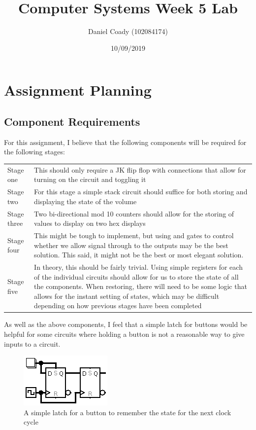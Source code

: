 \documentclass[11pt]{scrartcl}
\title{Computer Systems Week 5 Lab}
\author{Daniel Coady (102084174)}
\date{10/09/2019}
\begin{document}
\maketitle

\section*{Assignment Planning}
\subsection*{Component Requirements}
For this assignment, I believe that the following components will be required for
the following stages:

\bigskip

\begin{tabular}{p{2cm} p{10cm}}
    Stage one & This should only require a JK flip flop with connections that allow
                for turning on the circuit and toggling it \\[1em]
    Stage two & For this stage a simple stack circuit should suffice for both storing
                and displaying the state of the volume \\[1em]
    Stage three & Two bi-directional mod 10 counters should allow for the storing
                  of values to display on two hex displays \\[1em]
    Stage four & This might be tough to implement, but using and gates to control
                 whether we allow signal through to the outputs may be the best
                 solution. This said, it might not be the best or most elegant
                 solution.\\[1em]
    Stage five & In theory, this should be fairly trivial. Using simple registers
                 for each of the individual circuits should allow for us to store the
                 state of all the components. When restoring, there will need to be
                 some logic that allows for the instant setting of states, which
                 may be difficult depending on how previous stages have been completed \\[1em]
\end{tabular}

\pagebreak

As well as the above components, I feel that a simple latch for buttons would be
helpful for some circuits where holding a button is not a reasonable way to give
inputs to a circuit.

\begin{figure}[h]
    \centering
    \includegraphics{images/buttonlatch.png}
    \caption{A simple latch for a button to remember the state for the next clock cycle}
\end{figure}
\end{document}
